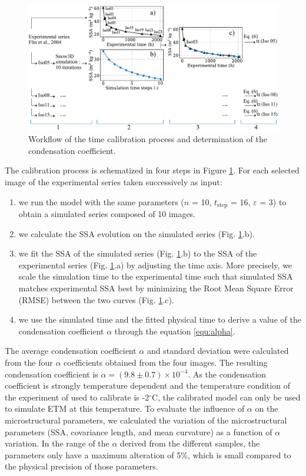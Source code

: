 \documentclass[draft,ms]{agujournal2019}
\begin{document}
\begin{figure}
    \centering
    \includegraphics[width = \linewidth]{Figures/workflow_aff_050122.pdf}
    \caption{Workflow of the time calibration process and determination of the condensation coefficient.}
    \label{fig:workflow}
\end{figure}

The calibration process is schematized in four steps in Figure \ref{fig:workflow}. For each selected image of the experimental series taken successively as input:
\begin{enumerate}
    \item we run the model with the same parameters ($n$ = 10, $t_{\mathrm{step}}$ = 16, $\varepsilon$ = 3) to obtain a simulated series composed of 10 images. 
    \item we calculate the SSA evolution on the simulated series (Fig. \ref{fig:workflow}.b).
    \item we fit the SSA of the simulated series (Fig. \ref{fig:workflow}.b) to the SSA of the experimental series (Fig. \ref{fig:workflow}.a) by adjusting the time axis. More precisely, we scale the simulation time to the experimental time such that simulated SSA matches experimental SSA best by minimizing the Root Mean Square Error (RMSE) between the two curves (Fig. \ref{fig:workflow}.c).   
    \item we use the simulated time and the fitted physical time to derive a value of the condensation coefficient $\alpha$ through the equation \eqref{equ:alpha}. 
\end{enumerate}

The average condensation coefficient $\alpha$ and standard deviation were calculated from the four $\alpha$ coefficients obtained from the four images. The resulting condensation coefficient is $\alpha = ( 9.8 \pm 0.7)\times 10^{-4}$. As the condensation coefficient is strongly temperature dependent and the temperature condition of the experiment of  used to calibrate is -2$^\circ$C, the calibrated model can only be used to simulate ETM at this temperature. To evaluate the influence of $\alpha$ on the microstructural parameters, we calculated the variation of the microstructural parameters (SSA, covariance length, and mean curvature) as a function of $\alpha$ variation. In the range of the $\alpha$ derived from the different samples, the parameters only have a maximum alteration of 5\%, which is small compared to the physical precision of those parameters. 
\end{document}
